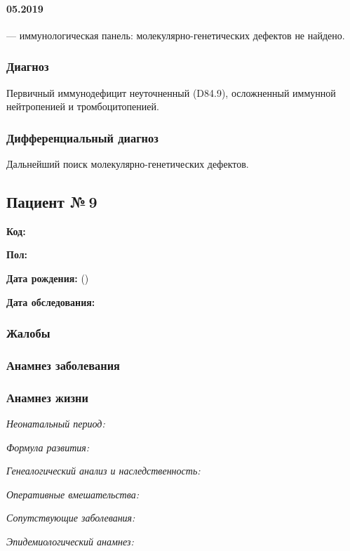 \documentclass[a4paper,14pt]{extarticle}
\begin{document}
\paragraph{05.2019} --- иммунологическая панель: молекулярно-генетических дефектов не найдено.

\subsubsection*{Диагноз}

Первичный иммунодефицит неуточненный (D84.9), осложненный иммунной нейтропенией и тромбоцитопенией.

\subsubsection*{Дифференциальный диагноз}

Дальнейший поиск молекулярно-генетических дефектов.

\newpage
\subsection*{Пациент №\,9}

\textbf{Код:} 

\textbf{Пол:}

\textbf{Дата рождения:}  ()

\textbf{Дата обследования:} 

\subsubsection*{Жалобы}

\subsubsection*{Анамнез заболевания}

\subsubsection*{Анамнез жизни}

\emph{Неонатальный период:}

\emph{Формула развития:}

\emph{Генеалогический анализ и наследственность:}

\emph{Оперативные вмешательства:}

\emph{Сопутствующие заболевания:}

\emph{Эпидемиологический анамнез:}
\end{document}
